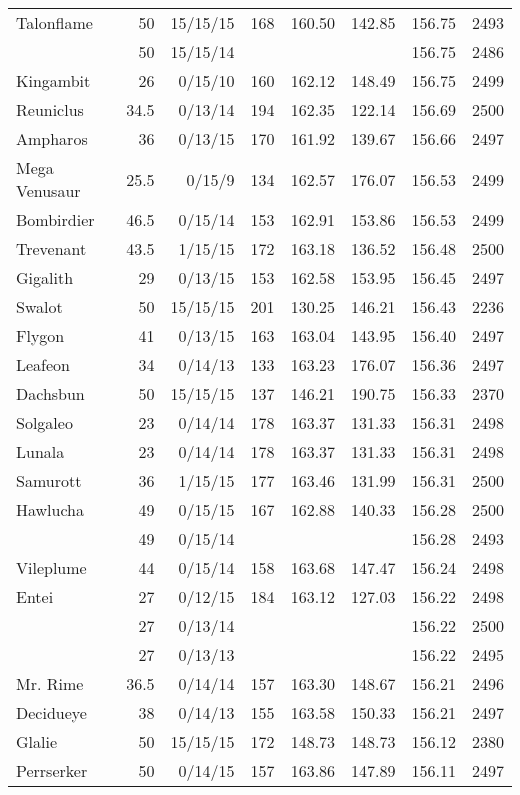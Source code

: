 \begin{longtable}{lrrrrrrr}
Talonflame & 50 & 15/15/15 & 168 & 160.50 & 142.85 & 156.75 & 2493\\
 & 50 & 15/15/14 & & & & 156.75 & 2486\\
Kingambit & 26 & 0/15/10 & 160 & 162.12 & 148.49 & 156.75 & 2499\\
Reuniclus & 34.5 & 0/13/14 & 194 & 162.35 & 122.14 & 156.69 & 2500\\
Ampharos & 36 & 0/13/15 & 170 & 161.92 & 139.67 & 156.66 & 2497\\
Mega Venusaur & 25.5 & 0/15/9 & 134 & 162.57 & 176.07 & 156.53 & 2499\\
Bombirdier & 46.5 & 0/15/14 & 153 & 162.91 & 153.86 & 156.53 & 2499\\
Trevenant & 43.5 & 1/15/15 & 172 & 163.18 & 136.52 & 156.48 & 2500\\
Gigalith & 29 & 0/13/15 & 153 & 162.58 & 153.95 & 156.45 & 2497\\
Swalot & 50 & 15/15/15 & 201 & 130.25 & 146.21 & 156.43 & 2236\\
Flygon & 41 & 0/13/15 & 163 & 163.04 & 143.95 & 156.40 & 2497\\
Leafeon & 34 & 0/14/13 & 133 & 163.23 & 176.07 & 156.36 & 2497\\
Dachsbun & 50 & 15/15/15 & 137 & 146.21 & 190.75 & 156.33 & 2370\\
Solgaleo & 23 & 0/14/14 & 178 & 163.37 & 131.33 & 156.31 & 2498\\
Lunala & 23 & 0/14/14 & 178 & 163.37 & 131.33 & 156.31 & 2498\\
Samurott & 36 & 1/15/15 & 177 & 163.46 & 131.99 & 156.31 & 2500\\
Hawlucha & 49 & 0/15/15 & 167 & 162.88 & 140.33 & 156.28 & 2500\\
 & 49 & 0/15/14 & & & & 156.28 & 2493\\
Vileplume & 44 & 0/15/14 & 158 & 163.68 & 147.47 & 156.24 & 2498\\
Entei & 27 & 0/12/15 & 184 & 163.12 & 127.03 & 156.22 & 2498\\
 & 27 & 0/13/14 & & & & 156.22 & 2500\\
 & 27 & 0/13/13 & & & & 156.22 & 2495\\
Mr. Rime & 36.5 & 0/14/14 & 157 & 163.30 & 148.67 & 156.21 & 2496\\
Decidueye & 38 & 0/14/13 & 155 & 163.58 & 150.33 & 156.21 & 2497\\
Glalie & 50 & 15/15/15 & 172 & 148.73 & 148.73 & 156.12 & 2380\\
Perrserker & 50 & 0/14/15 & 157 & 163.86 & 147.89 & 156.11 & 2497\\

\end{longtable}
